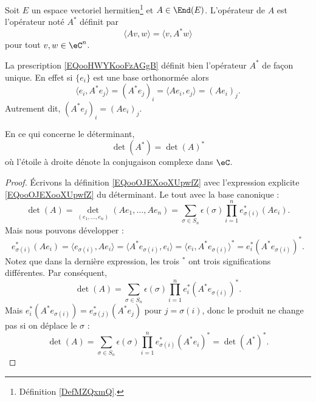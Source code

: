 \begin{definition}      \label{DEFooROVNooFlTbSK}
    Soit \( E\) un espace vectoriel hermitien\footnote{Définition \ref{DefMZQxmQ}.} et \( A\in\End(E)\). L'opérateur  de \( A\) est l'opérateur noté \( A^*\) définit par
    \begin{equation}    \label{EQooHWYKooFzAGgB}
        \langle Av, w\rangle =\langle v, A^*w\rangle 
    \end{equation}
    pour tout \( v,w\in \eC^n\).
\end{definition}

La prescription \eqref{EQooHWYKooFzAGgB} définit bien l'opérateur \( A^*\) de façon unique. En effet si \( \{ e_i \}\) est une base orthonormée alors
\begin{equation}
    \langle e_i, A^*e_j\rangle =(A^*e_j)_i=\langle Ae_i, e_j\rangle =(Ae_i)_j.
\end{equation}
Autrement dit, \( (A^*e_j)_i=(Ae_i)_j\).

\begin{proposition}     \label{PROPooSHZMooGwdfBd}
    En ce qui concerne le déterminant,
    \begin{equation}
        \det(A^*)=\det(A)^*
    \end{equation}
    où l'étoile à droite dénote la conjugaison complexe dans \( \eC\).
\end{proposition}

\begin{proof}
    Écrivons la définition \eqref{EQooOJEXooXUpwfZ} avec l'expression explicite \eqref{EQooOJEXooXUpwfZ} du déterminant. Le tout avec la base canonique :
    \begin{equation}
            \det(A)=\det_{(e_1,\ldots, e_n)}(Ae_1,\ldots, Ae_n)=\sum_{\sigma\in S_n}\epsilon(\sigma)\prod_{i=1}^ne_{\sigma(i)}^*(Ae_i).
    \end{equation}
    Mais nous pouvons développer :
    \begin{equation}
        e^*_{\sigma(i)}(Ae_i)=\langle e_{\sigma(i)}, Ae_i\rangle =\langle A^*e_{\sigma(i)}, e_i\rangle =\langle e_i, A^*e_{\sigma(i)}\rangle^*=e_i^*(A^*e_{\sigma(i)})^*.
    \end{equation}
    Notez que dans la dernière expression, les trois \( {}^*\) ont trois significations différentes. Par conséquent,
    \begin{equation}
        \det(A)=\sum_{\sigma\in S_n}\epsilon(\sigma)\prod_{i=1}^{n}e_i^*(A^*e_{\sigma(i)})^*.
    \end{equation}
    Mais \( e_i^*(A^*e_{\sigma(i)})=e_{\sigma(j)}^*(A^*e_{j})\) pour \( j=\sigma(i)\), donc le produit ne change pas si on déplace le \( \sigma\) :
    \begin{equation}
        \det(A)=\sum_{\sigma\in S_n}\epsilon(\sigma)\prod_{i=1}^{n}e_{\sigma(i)}^*(A^*e_{i})^*=\det(A^*)^*.
    \end{equation}
\end{proof}


